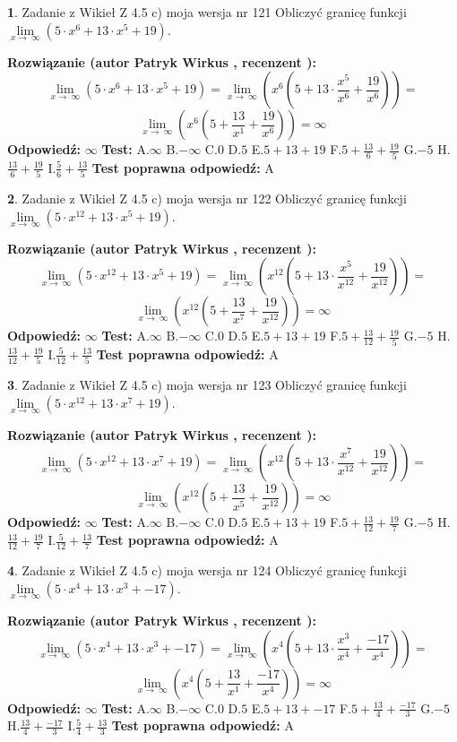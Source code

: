 \documentclass[12pt, a4paper]{article}
\theoremstyle{definition} %
\newtheorem{zad}{}
\newcommand{\zadStart}[1]{\begin{zad}#1\newline}
\newcommand{\zadStop}{\end{zad}}
\newcommand{\rozwStart}[2]{\noindent \textbf{Rozwiązanie (autor #1 , recenzent #2): }\newline}
\newcommand{\rozwStop}{\newline}
\newcommand{\odpStart}{\noindent \textbf{Odpowiedź:}\newline}
\newcommand{\odpStop}{\newline}
\newcommand{\testStart}{\noindent \textbf{Test:}\newline}
\newcommand{\testStop}{\newline}
\newcommand{\kluczStart}{\noindent \textbf{Test poprawna odpowiedź:}\newline}
\newcommand{\kluczStop}{\newline}
\begin{document}
\zadStart{Zadanie z Wikieł Z 4.5 c) moja wersja nr 121}
Obliczyć granicę funkcji  $\lim\limits_{x\to\ \infty}(5 \cdot x^{6}+13 \cdot x^{5}+19)$.
\zadStop
\rozwStart{Patryk Wirkus}{}
$$\lim\limits_{x\to\ \infty}(5 \cdot x^{6}+13 \cdot x^{5}+19) = \lim\limits_{x\to\ \infty}(x^{6}(5 +13 \cdot \frac{x^{5}}{x^{6}}+\frac{19}{x^{6}})) =$$ $$\lim\limits_{x\to\ \infty}(x^{6}(5 +\frac{13}{x^{1}}+\frac{19}{x^{6}})) =\infty$$
\rozwStop
\odpStart
$\infty$
\odpStop
\testStart
A.$\infty$ B.$-\infty$ C.$0$ D.$5$ E.$5 + 13 + 19$
F.$5+\frac{13}{6}+\frac{19}{5}$ G.$-5$
H.$\frac{13}{6}+\frac{19}{5}$
I.$\frac{5}{6}+\frac{13}{5}$
\testStop
\kluczStart
A
\kluczStop



\zadStart{Zadanie z Wikieł Z 4.5 c) moja wersja nr 122}
Obliczyć granicę funkcji  $\lim\limits_{x\to\ \infty}(5 \cdot x^{12}+13 \cdot x^{5}+19)$.
\zadStop
\rozwStart{Patryk Wirkus}{}
$$\lim\limits_{x\to\ \infty}(5 \cdot x^{12}+13 \cdot x^{5}+19) = \lim\limits_{x\to\ \infty}(x^{12}(5 +13 \cdot \frac{x^{5}}{x^{12}}+\frac{19}{x^{12}})) =$$ $$\lim\limits_{x\to\ \infty}(x^{12}(5 +\frac{13}{x^{7}}+\frac{19}{x^{12}})) =\infty$$
\rozwStop
\odpStart
$\infty$
\odpStop
\testStart
A.$\infty$ B.$-\infty$ C.$0$ D.$5$ E.$5 + 13 + 19$
F.$5+\frac{13}{12}+\frac{19}{5}$ G.$-5$
H.$\frac{13}{12}+\frac{19}{5}$
I.$\frac{5}{12}+\frac{13}{5}$
\testStop
\kluczStart
A
\kluczStop



\zadStart{Zadanie z Wikieł Z 4.5 c) moja wersja nr 123}
Obliczyć granicę funkcji  $\lim\limits_{x\to\ \infty}(5 \cdot x^{12}+13 \cdot x^{7}+19)$.
\zadStop
\rozwStart{Patryk Wirkus}{}
$$\lim\limits_{x\to\ \infty}(5 \cdot x^{12}+13 \cdot x^{7}+19) = \lim\limits_{x\to\ \infty}(x^{12}(5 +13 \cdot \frac{x^{7}}{x^{12}}+\frac{19}{x^{12}})) =$$ $$\lim\limits_{x\to\ \infty}(x^{12}(5 +\frac{13}{x^{5}}+\frac{19}{x^{12}})) =\infty$$
\rozwStop
\odpStart
$\infty$
\odpStop
\testStart
A.$\infty$ B.$-\infty$ C.$0$ D.$5$ E.$5 + 13 + 19$
F.$5+\frac{13}{12}+\frac{19}{7}$ G.$-5$
H.$\frac{13}{12}+\frac{19}{7}$
I.$\frac{5}{12}+\frac{13}{7}$
\testStop
\kluczStart
A
\kluczStop



\zadStart{Zadanie z Wikieł Z 4.5 c) moja wersja nr 124}
Obliczyć granicę funkcji  $\lim\limits_{x\to\ \infty}(5 \cdot x^{4}+13 \cdot x^{3}+-17)$.
\zadStop
\rozwStart{Patryk Wirkus}{}
$$\lim\limits_{x\to\ \infty}(5 \cdot x^{4}+13 \cdot x^{3}+-17) = \lim\limits_{x\to\ \infty}(x^{4}(5 +13 \cdot \frac{x^{3}}{x^{4}}+\frac{-17}{x^{4}})) =$$ $$\lim\limits_{x\to\ \infty}(x^{4}(5 +\frac{13}{x^{1}}+\frac{-17}{x^{4}})) =\infty$$
\rozwStop
\odpStart
$\infty$
\odpStop
\testStart
A.$\infty$ B.$-\infty$ C.$0$ D.$5$ E.$5 + 13 + -17$
F.$5+\frac{13}{4}+\frac{-17}{3}$ G.$-5$
H.$\frac{13}{4}+\frac{-17}{3}$
I.$\frac{5}{4}+\frac{13}{3}$
\testStop
\kluczStart
A
\kluczStop
\end{document}
